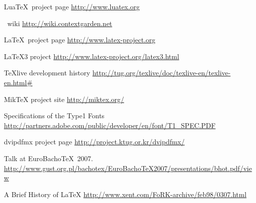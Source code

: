 \documentclass{scrartcl}
\begin{document}
\begin{thebibliography}{10}
	{Lua\TeX\ project page}
	\newblock \url{http://www.luatex.org}
	
	\vspace{2ex}
	\vspace{1ex}
	\ConTeXt\ wiki
	\newblock \url{http://wiki.contextgarden.net}
	
	{\LaTeX\ project page}
	\newblock \url{http://www.latex-project.org}
	
	{\LaTeX3 project}
	\newblock \url{http://www.latex-project.org/latex3.html}
	
	\vspace{2ex}
	\vspace{1ex}
	{TeXlive development history}
	\newblock \url{http://tug.org/texlive/doc/texlive-en/texlive-en.html#}

	{MikTeX project site}
	\newblock \url{http://miktex.org/}

	\vspace{2ex}
	\vspace{1ex}

	{Specifications of the Type1 Fonts}
	\newblock \url{http://partners.adobe.com/public/developer/en/font/T1_SPEC.PDF}

	\vspace{2ex}
	\vspace{1ex}
	{dvipdfmx project page}
	\newblock \url{http://project.ktug.or.kr/dvipdfmx/}
	
	\vspace{2ex}
	\vspace{1ex}
	\newblock Talk at EuroBacho\TeX\ 2007.\\
	\newblock \url{http://www.gust.org.pl/bachotex/EuroBachoTeX2007/presentations/bhot.pdf/view}
	
	{A Brief History of \LaTeX}
	\newblock \url{http://www.xent.com/FoRK-archive/feb98/0307.html}
	

\end{thebibliography}
\end{document}
